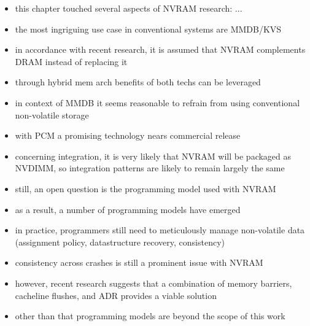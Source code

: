 \begin{itemize}
    \item this chapter touched several aspects of NVRAM research: ...
    \item the most ingriguing use case in conventional systems are MMDB/KVS
    \item in accordance with recent research, it is assumed that NVRAM complements DRAM instead of replacing it
    \item through hybrid mem arch benefits of both techs can be leveraged
    \item in context of MMDB it seems reasonable to refrain from using conventional non-volatile storage
    \item with PCM a promising technology nears commercial release
    \item concerning integration, it is very likely that NVRAM will be packaged as NVDIMM, so integration patterns are likely to remain largely the same
    \item still, an open question is the programming model used with NVRAM
    \item as a result, a number of programming models have emerged
    \item in practice, programmers still need to meticulously manage non-volatile data (assignment policy, datastructure recovery, consistency)
    \item consistency across crashes is still a prominent issue with NVRAM
    \item however, recent research suggests that a combination of memory barriers, cacheline flushes, and ADR provides a viable solution
    \item other than that programming models are beyond the scope of this work
\end{itemize}
